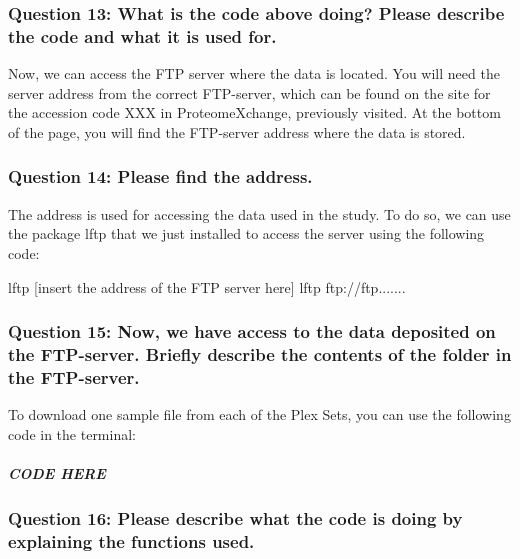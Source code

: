 \documentclass[
  letterpaper,
  DIV=11,
  numbers=noendperiod]{scrartcl}
\let\oldsubparagraph\subparagraph
\renewcommand{\subparagraph}[1]{\oldsubparagraph{#1}\mbox{}}
\newenvironment{Shaded}{\begin{snugshade}}{\end{snugshade}}
\newcommand{\ExtensionTok}[1]{\textcolor[rgb]{0.00,0.23,0.31}{#1}}
\newcommand{\NormalTok}[1]{\textcolor[rgb]{0.00,0.23,0.31}{#1}}
\begin{document}
\subsubsection{Question 13: What is the code above doing? Please
describe the code and what it is used
for.}\label{question-13-what-is-the-code-above-doing-please-describe-the-code-and-what-it-is-used-for.}

Now, we can access the FTP server where the data is located. You will
need the server address from the correct FTP-server, which can be found
on the site for the accession code XXX in ProteomeXchange, previously
visited. At the bottom of the page, you will find the FTP-server address
where the data is stored.

\subsubsection{Question 14: Please find the
address.}\label{question-14-please-find-the-address.}

The address is used for accessing the data used in the study. To do so,
we can use the package lftp that we just installed to access the server
using the following code:

\begin{Shaded}
\begin{Highlighting}[]
\ExtensionTok{lftp}\NormalTok{ [insert the address of the FTP server here]}
\ExtensionTok{lftp}\NormalTok{ ftp://ftp.......}
\end{Highlighting}
\end{Shaded}

\subsubsection{Question 15: Now, we have access to the data deposited on
the FTP-server. Briefly describe the contents of the folder in the
FTP-server.}\label{question-15-now-we-have-access-to-the-data-deposited-on-the-ftp-server.-briefly-describe-the-contents-of-the-folder-in-the-ftp-server.}

To download one sample file from each of the Plex Sets, you can use the
following code in the terminal:

\subparagraph{CODE HERE}\label{code-here}

\subsubsection{Question 16: Please describe what the code is doing by
explaining the functions
used.}\label{question-16-please-describe-what-the-code-is-doing-by-explaining-the-functions-used.}
\end{document}
